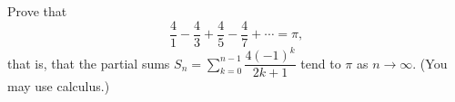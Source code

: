 Prove that
\[
\dfrac{4}{1}-\dfrac{4}{3}+\dfrac{4}{5}-\dfrac{4}{7}+\cdots=\pi,
\]
that is, that the partial sums $S_n=\displaystyle\sum_{k=0}^{n-1}\dfrac{4(-1)^k}{2k+1}$ tend to $\pi$ as $n\to\infty$. (You may use calculus.)
